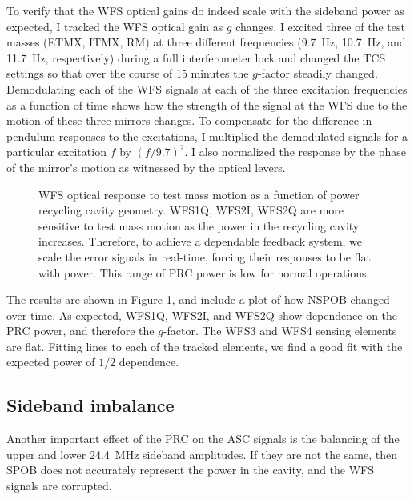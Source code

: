 To verify that the WFS optical gains do indeed scale with the sideband
power as expected, I tracked the WFS optical gain as $g$ changes. I
excited three of the test masses (ETMX, ITMX, RM) at three different
frequencies (9.7~Hz, 10.7~Hz, and 11.7~Hz, respectively) during a full
interferometer lock and changed the TCS settings so that over the
course of 15 minutes the $g$-factor steadily changed. Demodulating
each of the WFS signals at each of the three excitation frequencies as
a function of time shows how the strength of the signal at the WFS due
to the motion of these three mirrors changes. To compensate for the
difference in pendulum responses to the excitations, I multiplied the
demodulated signals for a particular excitation $f$ by $(f/9.7)^2$. I
also normalized the response by the phase of the mirror's motion as
witnessed by the optical levers.

\begin{figure}
\begin{centering}
\caption[Measured dependence of the WFS error signals on the power
recycling cavity geometry]{WFS optical response to test mass motion as
  a function of power recycling cavity geometry. WFS1Q, WFS2I, WFS2Q
  are more sensitive to test mass motion as the power in the recycling
  cavity increases. Therefore, to achieve a dependable feedback
  system, we scale the error signals in real-time, forcing their
  responses to be flat with power. This range of PRC power is low for
  normal operations.}
\label{fig:WFStrack}
\end{centering}
\end{figure}

The results are shown in Figure \ref{fig:WFStrack}, and include a plot
of how NSPOB changed over time. As expected, WFS1Q, WFS2I, and WFS2Q
show dependence on the PRC power, and therefore the $g$-factor. The
WFS3 and WFS4 sensing elements are flat. Fitting lines to each of the
tracked elements, we find a good fit with the expected power of $1/2$
dependence. 



\subsection{Sideband imbalance}
Another important effect of the PRC on the ASC signals is the
balancing of the upper and lower 24.4~MHz sideband amplitudes. If they
are not the same, then SPOB does not accurately represent the power in
the cavity, and the WFS signals are
corrupted. %

